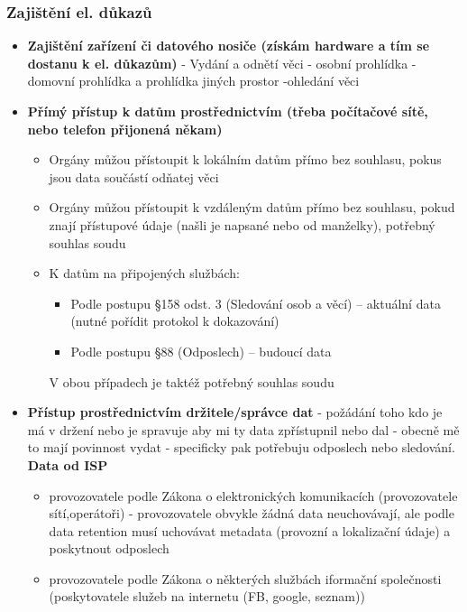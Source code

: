 \subsubsection{Zajištění el. důkazů}
\begin{itemize}
    \item \textbf{Zajištění zařízení či datového nosiče (získám hardware a tím se dostanu k el. důkazům)} - Vydání a odnětí věci - osobní prohlídka - domovní prohlídka a prohlídka jiných prostor -ohledání věci
    \item \textbf{Přímý přístup k datům prostřednictvím (třeba počítačové sítě, nebo telefon přijonená někam)} 
    \begin{itemize}
        \item Orgány můžou přístoupit k lokálním datům přímo bez souhlasu, pokus jsou data součástí odňatej věci
        \item Orgány můžou přístoupit k vzdáleným datům přímo bez souhlasu, pokud znají přístupové údaje (našli je napsané nebo od manželky), potřebný souhlas soudu
        \item K datům na připojených službách:
        \begin{itemize}
            \item Podle postupu §158 odst. 3  (Sledování osob a věcí) -- aktuální data (nutné pořídit protokol k dokazování)
            \item Podle postupu §88 (Odposlech) -- budoucí data
        \end{itemize}
        V obou případech je taktéž potřebný souhlas soudu
    \end{itemize}
    \item \textbf{Přístup prostřednictvím držitele/správce dat} - požádání toho kdo je má v držení nebo je spravuje aby mi ty data zpřístupnil nebo dal - obecně mě to mají povinnost vydat - specificky pak potřebuju odposlech nebo sledování. \newline
    \textbf{Data od ISP}
    \begin{itemize}
        \item provozovatele podle Zákona o elektronických komunikacích (provozovatele sítí,operátoři)  - provozovatele obvykle žádná data neuchovávají, ale podle data retention musí uchovávat metadata (provozní a lokalizační údaje) a poskytnout odposlech
        \item provozovatele podle Zákona o některých službách iformační společnosti (poskytovatele služeb na internetu (FB, google, seznam)) 
    \end{itemize}

\end{itemize}
